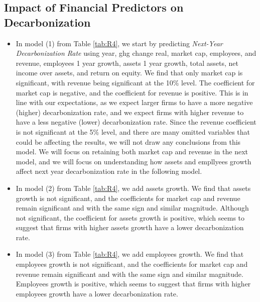 


\subsection{Impact of Financial Predictors on Decarbonization}

\begin{itemize}
    \item In model (1) from Table \ref{tab:R4}, we start by predicting \textit{Next-Year Decarbonization Rate} using year, ghg change real, market cap, employees, and revenue, employees 1 year growth, assets 1 year growth, total assets, net income over assets, and return on equity. We find that only market cap is significant, with revenue being significant at the 10\% level. The coefficient for market cap is negative, and the coefficient for revenue is positive. This is in line with our expectations, as we expect larger firms to have a more negative (higher) decarbonization rate, and we expect firms with higher revenue to have a less negative (lower) decarbonization rate. Since the revenue coefficient is not significant at the 5\% level, and there are many omitted variables that could be affecting the results, we will not draw any conclusions from this model. We will focus on retaining both market cap and revenue in the next model, and we will focus on understanding how assets and empllyees growth affect next year decarbonization rate in the following model.
    \item In model (2) from Table \ref{tab:R4}, we add assets growth. We find that assets growth is not significant, and the coefficients for market cap and revenue remain significant and with the same sign and similar magnitude. Although not significant, the coefficient for assets growth is positive, which seems to suggest that firms with higher assets growth have a lower decarbonization rate.
    \item In model (3) from Table \ref{tab:R4}, we add employees growth. We find that employees growth is not significant, and the coefficients for market cap and revenue remain significant and with the same sign and similar magnitude. Employees growth is positive, which seems to suggest that firms with higher employees growth have a lower decarbonization rate. 
\end{itemize}



